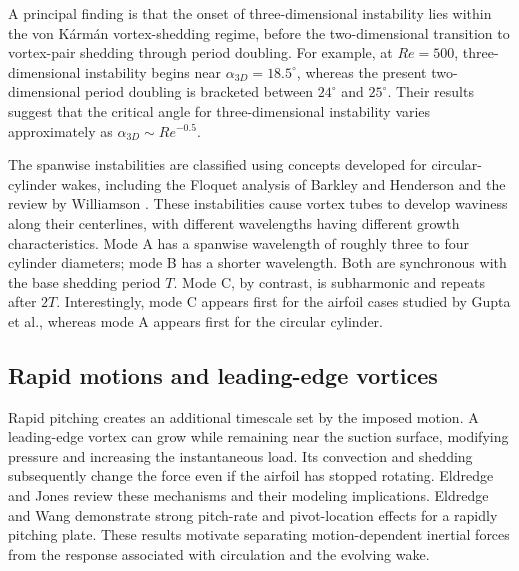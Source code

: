 
A principal finding is that the onset of three-dimensional instability lies within the von K\'arm\'an vortex-shedding regime, before the two-dimensional transition to vortex-pair shedding through period doubling. For example, at $Re=500$, three-dimensional instability begins near $\alpha_{3D}=18.5^\circ$, whereas the present two-dimensional period doubling is bracketed between $24^\circ$ and $25^\circ$.
 Their results suggest that the critical angle for three-dimensional instability varies approximately as $\alpha_{3D}\sim Re^{-0.5}$.

The spanwise instabilities are classified using concepts developed for circular-cylinder wakes, including the Floquet analysis of Barkley and Henderson \cite{barkley} and the review by Williamson \cite{williamson}. These instabilities cause vortex tubes to develop waviness along their centerlines, with different wavelengths having different growth characteristics. Mode A has a spanwise wavelength of roughly three to four cylinder diameters; mode B has a shorter wavelength. Both are synchronous with the base shedding period $T$. Mode C, by contrast, is subharmonic and repeats after $2T$. Interestingly, mode C appears first for the airfoil cases studied by Gupta et al., whereas mode A appears first for the circular cylinder.

\subsection{Rapid motions and leading-edge vortices}
Rapid pitching creates an additional timescale set by the imposed motion. A leading-edge vortex can grow while remaining near the suction surface, modifying pressure and increasing the instantaneous load. Its convection and shedding subsequently change the force even if the airfoil has stopped rotating. Eldredge and Jones \cite{eldredge2019} review these mechanisms and their modeling implications. Eldredge and Wang \cite{eldredge2010} demonstrate strong pitch-rate and pivot-location effects for a rapidly pitching plate. These results motivate separating motion-dependent inertial forces from the response associated with circulation and the evolving wake.

